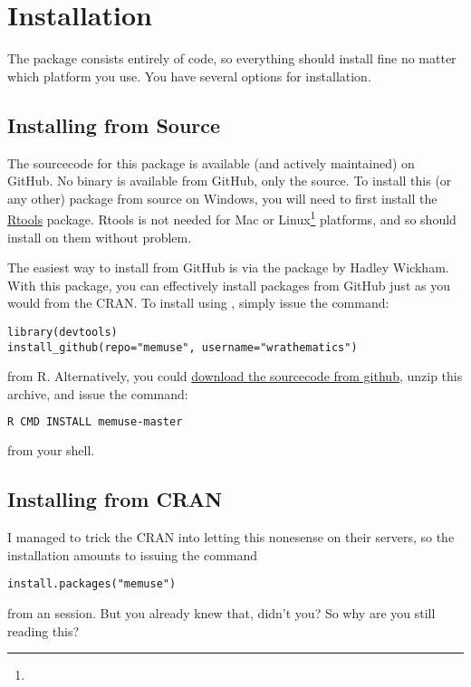 \section{Installation}

The package consists entirely of  code, so everything should install 
fine no matter which platform you use.  You have several options for 
installation.


\subsection{Installing from Source}

The sourcecode for this package is available (and actively maintained) on 
GitHub.  No binary is available from GitHub, only the source.  To install this 
(or any other) package from source on Windows, you will need to first install 
the \href{http://cran.r-project.org/bin/windows/Rtools/Rtools216.exe}{Rtools} 
package.  Rtools is not needed for Mac or Linux\footnote{\interject} 
platforms, and so  should install on them without problem.

The easiest way to install  from GitHub is via the \href{http://cran.r-project.org/web/packages/devtools/index.html}{} package by Hadley Wickham.  With this package, you can effectively install packages from GitHub just as you would from the CRAN.  To install  using , simply issue the command:
\begin{lstlisting}[language=rr]
library(devtools)
install_github(repo="memuse", username="wrathematics")
\end{lstlisting}
from R.  Alternatively, you could  
\href{https://github.com/wrathematics/memuse/archive/master.zip}{download the 
sourcecode from github}, unzip this archive, and issue the command:
\begin{lstlisting}[language=sh]
R CMD INSTALL memuse-master
\end{lstlisting}
from your shell.


\subsection{Installing from CRAN}

I managed to trick the CRAN into letting this nonesense on their servers, 
so the installation amounts to issuing the command
\begin{lstlisting}[language=rr]
install.packages("memuse")
\end{lstlisting}
from an  session.  But you already knew that, didn't you?  So why are you still reading this?